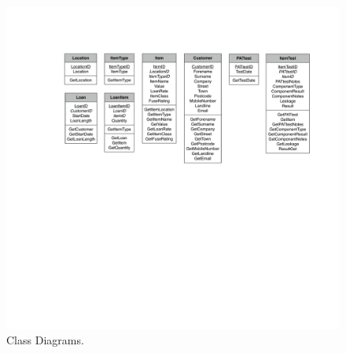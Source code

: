 \begin{landscape}
    \begin{figure}[H]
        \centerline{\includegraphics[width=450px]{./Design/Class_Definitions/Class_definitions.pdf}}
        \caption{Class Diagrams.} \label{fig:relationship_diagram}
    \end{figure}


\end{landscape}

\newpage

